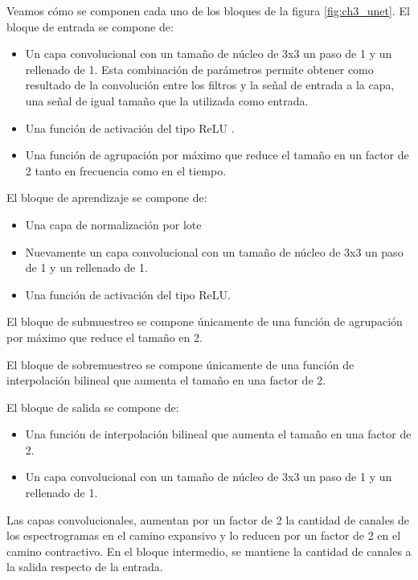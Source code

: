 Veamos cómo se componen cada uno de los bloques de la figura \ref{fig:ch3_unet}. El bloque de entrada se compone de:

\begin{itemize}
	\item Un capa convolucional con un tamaño de núcleo de 3x3 un paso de 1 y un rellenado de 1. Esta combinación de parámetros permite obtener como resultado de la convolución entre los filtros y la señal de entrada a la capa, una señal de igual tamaño que la utilizada como entrada.
	\item Una función de activación del tipo ReLU \cite{deep_learning}.
	\item Una función de agrupación por máximo que reduce el tamaño en un factor de 2 tanto en frecuencia como en el tiempo.
\end{itemize}

El bloque de aprendizaje se compone de:

\begin{itemize}
	\item Una capa de normalización por lote \cite{deep_learning}
	\item Nuevamente un capa convolucional con un tamaño de núcleo de 3x3 un paso de 1 y un rellenado de 1.
	\item Una función de activación del tipo ReLU.
\end{itemize}

El bloque de submuestreo se compone únicamente de una función de agrupación por máximo que reduce el tamaño en 2.

El bloque de sobremuestreo se compone únicamente de una función de interpolación bilineal que aumenta el tamaño en una factor de 2.

El bloque de salida se compone de:

\begin{itemize}
	\item Una función de interpolación bilineal que aumenta el tamaño en una factor de 2.
	\item Un capa convolucional con un tamaño de núcleo de 3x3 un paso de 1 y un rellenado de 1.
\end{itemize}

Las capas convolucionales, aumentan por un factor de 2 la cantidad de canales de los espectrogramas en el camino expansivo y lo reducen por un factor de 2 en el camino contractivo. En el bloque intermedio, se mantiene la cantidad de canales a la salida respecto de la entrada.

